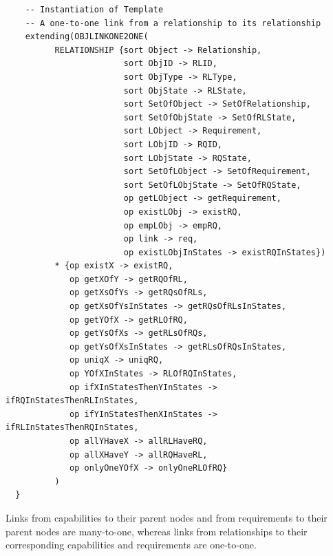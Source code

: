 \documentclass[12pt]{report}
\begin{document}
\begin{verbatim}
    -- Instantiation of Template
    -- A one-to-one link from a relationship to its relationship
    extending(OBJLINKONE2ONE(
          RELATIONSHIP {sort Object -> Relationship,
                        sort ObjID -> RLID,
                        sort ObjType -> RLType,
                        sort ObjState -> RLState,
                        sort SetOfObject -> SetOfRelationship,
                        sort SetOfObjState -> SetOfRLState,
                        sort LObject -> Requirement,
                        sort LObjID -> RQID,
                        sort LObjState -> RQState,
                        sort SetOfLObject -> SetOfRequirement,
                        sort SetOfLObjState -> SetOfRQState,
                        op getLObject -> getRequirement,
                        op existLObj -> existRQ,
                        op empLObj -> empRQ,
                        op link -> req,
                        op existLObjInStates -> existRQInStates})
          * {op existX -> existRQ,
             op getXOfY -> getRQOfRL,
             op getXsOfYs -> getRQsOfRLs,
             op getXsOfYsInStates -> getRQsOfRLsInStates,
             op getYOfX -> getRLOfRQ,
             op getYsOfXs -> getRLsOfRQs,
             op getYsOfXsInStates -> getRLsOfRQsInStates,
             op uniqX -> uniqRQ,
             op YOfXInStates -> RLOfRQInStates,
             op ifXInStatesThenYInStates -> ifRQInStatesThenRLInStates,
             op ifYInStatesThenXInStates -> ifRLInStatesThenRQInStates,
             op allYHaveX -> allRLHaveRQ,
             op allXHaveY -> allRQHaveRL,
             op onlyOneYOfX -> onlyOneRLOfRQ}
          )
  }
\end{verbatim}
\normalsize
Links from capabilities to their parent nodes and from requirements to
their parent nodes are many-to-one, whereas links from relationships to
their corresponding capabilities and requirements are one-to-one.
\end{document}
